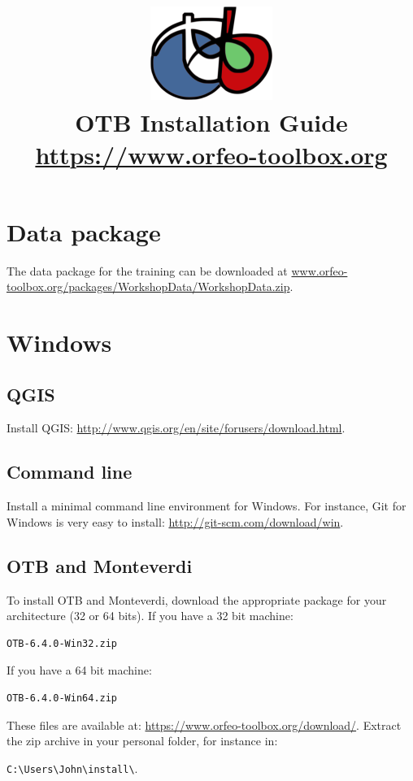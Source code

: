 \documentclass[10pt,a4paper]{article}
\title{\includegraphics[scale=1]{Art/otb-logo.png}\\
  OTB Installation Guide\\
  {\small\url{https://www.orfeo-toolbox.org}}
}
\begin{document}
\maketitle

\tableofcontents

\clearpage
\section{Data package}

The data package for the training can be downloaded at \url{www.orfeo-toolbox.org/packages/WorkshopData/WorkshopData.zip}.

\section{Windows}

\subsection{QGIS}
Install QGIS: \url{http://www.qgis.org/en/site/forusers/download.html}.

\subsection{Command line}
Install a minimal command line environment for Windows. For instance, Git for Windows is very easy to install:
\url{http://git-scm.com/download/win}.

\subsection{OTB and Monteverdi}
To install OTB and Monteverdi, download the appropriate package for your architecture (32 or 64 bits). If you have a 32 bit machine:

\begin{verbatim}
OTB-6.4.0-Win32.zip
\end{verbatim}

If you have a 64 bit machine:

\begin{verbatim}
OTB-6.4.0-Win64.zip
\end{verbatim}

These files are available at:
\url{https://www.orfeo-toolbox.org/download/}.
Extract the zip archive in your personal folder, for instance in:\\
\begin{centering}
\texttt{C:{\textbackslash}Users{\textbackslash}John{\textbackslash}install{\textbackslash}}.
\end{centering}
\end{document}
